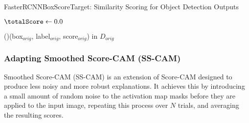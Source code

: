 \begin{algorithm}
    \caption{FasterRCNNBoxScoreTarget: Similarity Scoring for Object Detection Outputs}
    \label{alg:box-score-target}
    \DontPrintSemicolon
    \SetAlgoLined

    


    \BlankLine

    $\totalScore \gets 0.0$\;
    
    \ForAll(){(box$_{orig}$, label$_{orig}$, score$_{orig}$) \textup{in} $D_{orig}$}{
    }
    
    \Return{$\totalScore$}\;
\end{algorithm}

\subsubsection{Adapting Smoothed Score-CAM (SS-CAM)}
\label{subsubsec:adapting_sscam}

Smoothed Score-CAM (SS-CAM) is an extension of Score-CAM designed to produce less noisy and more robust explanations. It achieves this by introducing a small amount of random noise to the activation map masks before they are applied to the input image, repeating this process over $N$ trials, and averaging the resulting scores.

